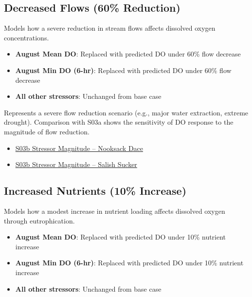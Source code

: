 \documentclass[
  letterpaper,
  DIV=11,
  numbers=noendperiod]{scrreprt}
\providecommand{\tightlist}{%
  \setlength{\itemsep}{0pt}\setlength{\parskip}{0pt}}
\begin{document}
\subsection*{Decreased Flows (60\%
Reduction)}\label{decreased-flows-60-reduction}

Models how a severe reduction in stream flows affects dissolved oxygen
concentrations.

\begin{itemize}
\tightlist
\item
  \textbf{August Mean DO}: Replaced with predicted DO under 60\% flow
  decrease
\item
  \textbf{August Min DO (6-hr)}: Replaced with predicted DO under 60\%
  flow decrease
\item
  \textbf{All other stressors}: Unchanged from base case
\end{itemize}

Represents a severe flow reduction scenario (e.g., major water
extraction, extreme drought). Comparison with S03a shows the sensitivity
of DO response to the magnitude of flow reduction.

\begin{itemize}
\tightlist
\item
  \href{./sample_data/ndss_nooksack_dace/S03b_Decrease\%20Flows\%2060pct.xlsx}{S03b
  Stressor Magnitude -- Nooksack Dace}
\item
  \href{./sample_data/ndss_salish_sucker/S03b_Decrease\%20Flows\%2060pct.xlsx}{S03b
  Stressor Magnitude -- Salish Sucker}
\end{itemize}

\subsection*{Increased Nutrients (10\%
Increase)}\label{increased-nutrients-10-increase}

Models how a modest increase in nutrient loading affects dissolved
oxygen through eutrophication.

\begin{itemize}
\tightlist
\item
  \textbf{August Mean DO}: Replaced with predicted DO under 10\%
  nutrient increase
\item
  \textbf{August Min DO (6-hr)}: Replaced with predicted DO under 10\%
  nutrient increase
\item
  \textbf{All other stressors}: Unchanged from base case
\end{itemize}
\end{document}
